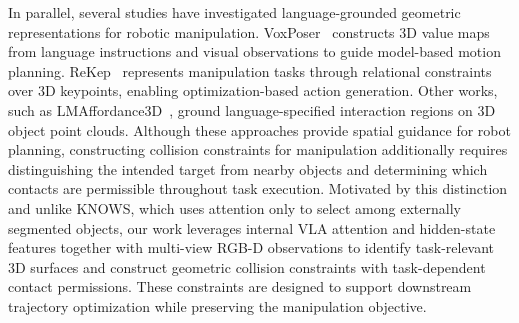In parallel, several studies have investigated language-grounded geometric representations for robotic manipulation. VoxPoser~\cite{huang2023voxposer} constructs 3D value maps from language instructions and visual observations to guide model-based motion planning. ReKep~\cite{huang2024rekep} represents manipulation tasks through relational constraints over 3D keypoints, enabling optimization-based action generation. Other works, such as LMAffordance3D~\cite{zhu2025lmaffordance3d}, ground language-specified interaction regions on 3D object point clouds. Although these approaches provide spatial guidance for robot planning, constructing collision constraints for manipulation additionally requires distinguishing the intended target from nearby objects and determining which contacts are permissible throughout task execution. Motivated by this distinction and unlike KNOWS, which uses attention only to select among externally segmented objects, our work leverages internal VLA attention and hidden-state features together with multi-view RGB-D observations to identify task-relevant 3D surfaces and construct geometric collision constraints with task-dependent contact permissions. These constraints are designed to support downstream trajectory optimization while preserving the manipulation objective.

